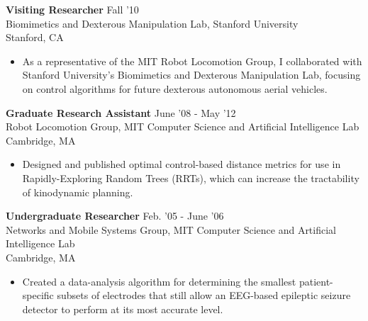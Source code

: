\documentclass[margin]{res}
\begin{document}
\begin{resume}
 {\bf Visiting Researcher} \hfill Fall '10 \\Biomimetics and Dexterous Manipulation Lab, Stanford University  \\ Stanford, CA 
 \begin{itemize} \itemsep -2pt  %
\item As a representative of the MIT Robot Locomotion Group, I collaborated with Stanford University's Biomimetics and Dexterous Manipulation Lab, focusing on control algorithms for future dexterous autonomous aerial vehicles.
 \end{itemize}

 {\bf Graduate Research Assistant} \hfill June '08 - May '12 \\ Robot Locomotion Group, MIT Computer Science and Artificial Intelligence Lab \\ Cambridge, MA 
 \begin{itemize} \itemsep -2pt  %
 \item Designed and published optimal control-based distance metrics for use in Rapidly-Exploring Random Trees (RRTs), which can increase the tractability of kinodynamic planning.
 \end{itemize}
 
% 
  {\bf Undergraduate Researcher} \hfill Feb. '05 - June '06 \\ Networks and Mobile Systems Group, MIT Computer Science and Artificial Intelligence Lab \\ Cambridge, MA 
 \begin{itemize} \itemsep -2pt  %
\item Created a data-analysis algorithm for determining the smallest patient-specific subsets of electrodes that still allow an EEG-based epileptic seizure detector to perform at its most accurate level. 
\end{itemize}
 

\end{resume}
\end{document}
